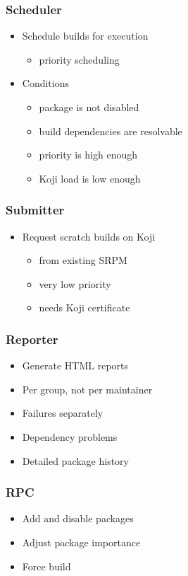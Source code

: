 \documentclass[pdftex,unicode,xcolor=table]{beamer}
\begin{document}
\begin{frame}
  \frametitle{Scheduler}
  \begin{itemize}
    \item Schedule builds for execution
    \begin{itemize}
      \item priority scheduling
    \end{itemize}
    \item Conditions
    \begin{itemize}
      \item package is not disabled
      \item build dependencies are resolvable
      \item priority is high enough
      \item Koji load is low enough
    \end{itemize}
  \end{itemize}
\end{frame}

\begin{frame}
  \frametitle{Submitter}
  \begin{itemize}
    \item Request scratch builds on Koji
    \begin{itemize}
      \item from existing SRPM
      \item very low priority
      \item needs Koji certificate
    \end{itemize}
  \end{itemize}
\end{frame}

\begin{frame}
  \frametitle{Reporter}
  \begin{itemize}
    \item Generate HTML reports
    \item Per group, not per maintainer
    \item Failures separately
    \item Dependency problems
    \item Detailed package history
  \end{itemize}
\end{frame}

\begin{frame}
  \frametitle{RPC}
  \begin{itemize}
    \item Add and disable packages
    \item Adjust package importance
    \item Force build
  \end{itemize}
\end{frame}
\end{document}
